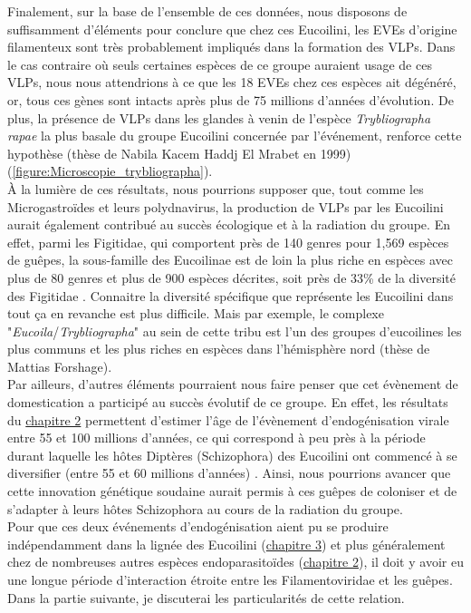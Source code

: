 Finalement, sur la base de l'ensemble de ces données, nous disposons de suffisamment d'éléments pour conclure que chez ces Eucoilini, les EVEs d'origine filamenteux sont très probablement impliqués dans la formation des VLPs. Dans le cas contraire où seuls certaines espèces de ce groupe auraient usage de ces VLPs, nous nous attendrions à ce que les 18 EVEs chez ces espèces ait dégénéré, or, tous ces gènes sont intacts après plus de 75 millions d'années d'évolution. De plus, la présence de VLPs dans les glandes à venin de l'espèce \textit{Trybliographa rapae} la plus basale du groupe Eucoilini concernée par l'événement, renforce cette hypothèse (thèse de Nabila Kacem Haddj El Mrabet en 1999) (\figurename{\ref{figure:Microscopie_trybliographa}}).\\ 

À la lumière de ces résultats, nous pourrions supposer que, tout comme les Microgastroïdes et leurs polydnavirus, la production de VLPs par les Eucoilini aurait également contribué au succès écologique et à la radiation du groupe. En effet, parmi les Figitidae, qui comportent près de 140 genres pour 1,569 espèces de guêpes, la sous-famille des Eucoilinae est de loin la plus riche en espèces avec plus de 80 genres et plus de 900 espèces décrites, soit près de 33\% de la diversité des Figitidae \citep{ronquist_phylogeny_1995}. Connaitre la diversité spécifique que représente les Eucoilini dans tout ça en revanche est plus difficile. Mais par exemple, le complexe "\textit{Eucoila}/\textit{Trybliographa}" au sein de cette tribu est l'un des groupes d'eucoilines les plus communs et les plus riches en espèces dans l'hémisphère nord (thèse de Mattias Forshage). \\

Par ailleurs, d'autres éléments pourraient nous faire penser que cet évènement de domestication a participé au succès évolutif de ce groupe. En effet, les résultats du \hyperref[sec:chap2]{chapitre 2} permettent d'estimer l'âge de l'évènement d'endogénisation virale entre 55 et 100 millions d'années, ce qui correspond à peu près à la période durant laquelle les hôtes Diptères (Schizophora) des Eucoilini ont commencé à se diversifier (entre 55 et 60 millions d'années) \citep{wiegmann_episodic_2011}. Ainsi, nous pourrions avancer que cette innovation génétique soudaine aurait permis à ces guêpes de coloniser et de s'adapter à leurs hôtes Schizophora au cours de la radiation du groupe.\\

Pour que ces deux événements d'endogénisation aient pu se produire indépendamment dans la lignée des Eucoilini (\hyperref[sec:chap3]{chapitre 3}) et plus généralement chez de nombreuses autres espèces endoparasitoïdes (\hyperref[sec:chap2]{chapitre 2}), il doit y avoir eu une longue période d'interaction étroite entre les Filamentoviridae et les guêpes. Dans la partie suivante, je discuterai les particularités de cette relation. 

